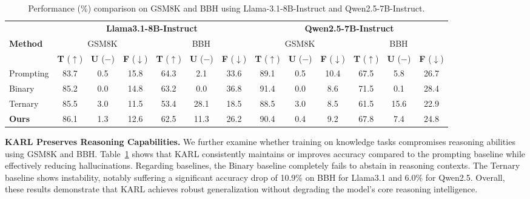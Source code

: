 \documentclass{article} %
\newcommand{\framename}{\textsc{KARL}}
\begin{document}
\begin{table}[t]
\scriptsize
\centering
\renewcommand{\arraystretch}{1.15}
\setlength{\tabcolsep}{4pt}

\begin{tabular}{lcccccccccccc}
\toprule
\rowcolor{myyellow}
& \multicolumn{6}{c}{\textbf{Llama3.1-8B-Instruct}} 
& \multicolumn{6}{c}{\textbf{Qwen2.5-7B-Instruct}} \\
\cmidrule(lr){2-7} \cmidrule(lr){8-13}

\multirow{2}{*}{\textbf{Method}}
& \multicolumn{3}{c}{GSM8K} & \multicolumn{3}{c}{BBH}
& \multicolumn{3}{c}{GSM8K} & \multicolumn{3}{c}{BBH} \\
\cmidrule(lr){2-4} \cmidrule(lr){5-7}
\cmidrule(lr){8-10} \cmidrule(lr){11-13}

& \textbf{T} ($\uparrow$) & \textbf{U} ($-$) & \textbf{F} ($\downarrow$) & \textbf{T} ($\uparrow$) & \textbf{U} ($-$) & \textbf{F} ($\downarrow$) & \textbf{T} ($\uparrow$) & \textbf{U} ($-$) & \textbf{F} ($\downarrow$) & \textbf{T} ($\uparrow$) & \textbf{U} ($-$) & \textbf{F} ($\downarrow$) \\
\midrule

Prompting 
& 83.7 & 0.5 & 15.8 & 64.3 & 2.1 & 33.6
& 89.1 & 0.5 & 10.4 & 67.5 & 5.8 & 26.7 \\

Binary
& 85.2 & 0.0 & 14.8 & 63.2 & 0.0 & 36.8
& 91.4 & 0.0 & 8.6 & 71.5 & 0.1 & 28.4 \\

Ternary
& 85.5 & 3.0 & 11.5 & 53.4 & 28.1 & 18.5
& 88.5 & 3.0 & 8.5 & 61.5 & 15.6 & 22.9 \\

\rowcolor{blue!5}
\textbf{Ours}
& 86.1 & 1.3 & 12.6 & 62.5 & 11.3 & 26.2
& 90.4 & 0.4 & 9.2 & 67.8 & 7.4 & 24.8 \\

\bottomrule
\end{tabular}

\caption{Performance (\%) comparison on GSM8K and BBH using Llama-3.1-8B-Instruct and Qwen2.5-7B-Instruct.}
\label{tb:reasoning_results}
\end{table} 


\noindent
\textbf{\framename{} Preserves Reasoning Capabilities.}
We further examine whether training on knowledge tasks compromises reasoning abilities using GSM8K and BBH.
Table~\ref{tb:reasoning_results} shows that \framename{} consistently maintains or improves accuracy compared to the prompting baseline while effectively reducing hallucinations.
Regarding baselines, the Binary baseline completely fails to abstain in reasoning contexts.
The Ternary baseline shows instability, notably suffering a significant accuracy drop of 10.9\% on BBH for Llama3.1 and 6.0\% for Qwen2.5.
Overall, these results demonstrate that \framename{} achieves robust generalization without degrading the model's core reasoning intelligence.
\end{document}
